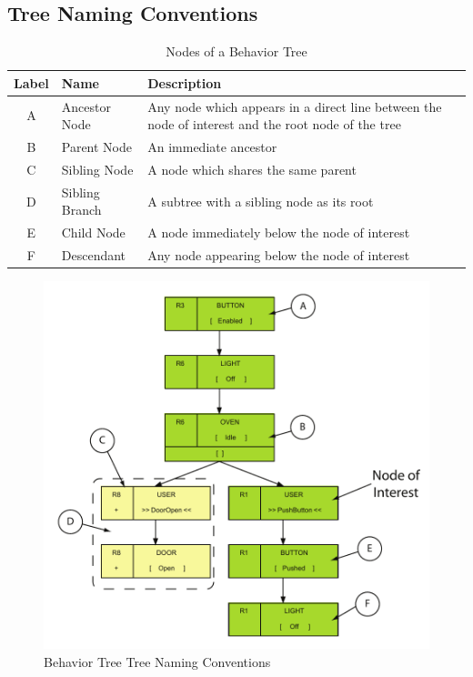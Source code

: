 \documentclass[]{article}
\begin{document}
\subsection{Tree Naming Conventions}

\begin{table}
\begin{tabularx}{\textwidth}{|c|l|X|}
\textbf{Label} & \textbf{Name} & \textbf{Description}\\ \hline
A & Ancestor Node & Any node which appears in a direct line between the node of interest and the root node of the tree\\ \hline
B & Parent Node & An immediate ancestor\\ \hline
C & Sibling Node & A node which shares the same parent\\ \hline
D & Sibling Branch & A subtree with a sibling node as its root\\ \hline
E & Child Node & A node immediately below the node of interest\\ \hline
F & Descendant & Any node appearing below the node of interest
\end{tabularx}

\caption{Nodes of a Behavior Tree}
\label{BTTree Nodes}
\end{table}

\begin{figure}
 \includegraphics{figs/AppendixB/Naming/Fig2}
 \caption{Behavior Tree Tree Naming Conventions}
 \label{fig:Naming2}
\end{figure}
\end{document}
